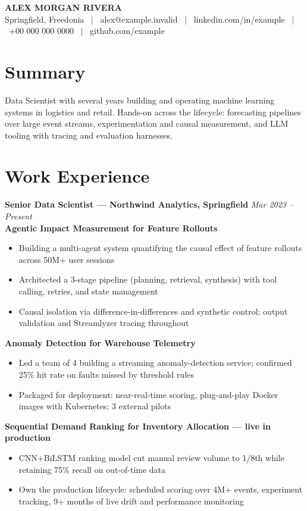 \documentclass[10pt]{article}
\newcommand{\entry}[2]{\textbf{#1} \hfill \textit{#2}\\[-0.35em]}
\newcommand{\proj}[1]{\vspace{0.5pt}\textbf{#1}\\[-0.4em]}
\begin{document}
\begin{center}
{\LARGE\bfseries ALEX MORGAN RIVERA}\\[2pt]
Springfield, Freedonia \ $|$ \ alex@example.invalid \ $|$ \ linkedin.com/in/example \ $|$ \ +00 000 000 0000 \ $|$ \ github.com/example
\end{center}
\vspace{-6pt}

\section{Summary}
Data Scientist with several years building and operating machine learning systems in logistics and retail. Hands-on across the lifecycle: forecasting pipelines over large event streams, experimentation and causal measurement, and LLM tooling with tracing and evaluation harnesses.

\section{Work Experience}
\entry{Senior Data Scientist — Northwind Analytics, Springfield}{Mar 2023 -- Present}

\proj{Agentic Impact Measurement for Feature Rollouts}
\begin{itemize}
\item Building a multi-agent system quantifying the causal effect of feature rollouts across 50M+ user sessions
\item Architected a 3-stage pipeline (planning, retrieval, synthesis) with tool calling, retries, and state management
\item Causal isolation via difference-in-differences and synthetic control; output validation and Streamlyzer tracing throughout
\end{itemize}

\proj{Anomaly Detection for Warehouse Telemetry}
\begin{itemize}
\item Led a team of 4 building a streaming anomaly-detection service; confirmed 25\% hit rate on faults missed by threshold rules
\item Packaged for deployment: near-real-time scoring, plug-and-play Docker images with Kubernetes; 3 external pilots
\end{itemize}

\proj{Sequential Demand Ranking for Inventory Allocation — live in production}
\begin{itemize}
\item CNN+BiLSTM ranking model cut manual review volume to 1/8th while retaining 75\% recall on out-of-time data
\item Own the production lifecycle: scheduled scoring over 4M+ events, experiment tracking, 9+ months of live drift and performance monitoring
\end{itemize}
\end{document}

